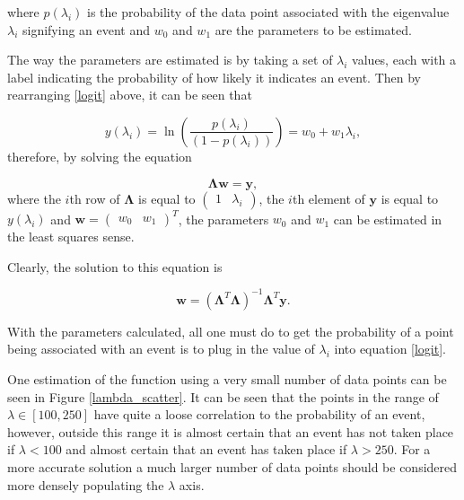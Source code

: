 \documentclass[11pt,a4paper]{article}
\begin{document}
where $p(\lambda_i)$ is the probability of the data point associated with the eigenvalue $\lambda_i$ signifying an event and $w_0$ and $w_1$ are the parameters to be estimated. 

The way the parameters are estimated is by taking a set of $\lambda_i$ values, each with a label indicating the probability of how likely it indicates an event. Then by rearranging \eqref{logit} above, it can be seen that

\begin{equation}
y(\lambda_i) = \ln\left( \frac{p(\lambda_i)}{(1-p(\lambda_i))}\right) = w_0 + w_1 \lambda_i,
\end{equation}
therefore, by solving the equation 

\begin{equation*}
 \mathbf{\Lambda}\mathbf{w} = \mathbf{y} ,
\end{equation*}
where the $i$th row of $\mathbf{\Lambda}$ is equal to $\left(\begin{matrix}
1 & \lambda_i
\end{matrix}  \right)$, the $i$th element of $\mathbf{y}$ is equal to $y(\lambda_i)$ and $\mathbf{w} = \left(\begin{matrix} w_0   &w_1\end{matrix}\right)^T$, the parameters $w_0$ and $w_1$ can be estimated in the least squares sense. 

Clearly, the solution to this equation is

\begin{equation*}
\mathbf{w} = \left( \mathbf{\Lambda}^T \mathbf{\Lambda}\right)^{-1} \mathbf{\Lambda}^T\mathbf{y}.
\end{equation*}

With the parameters calculated, all one must do to get the probability of a point being associated with an event is to plug in the value of $\lambda_i$ into equation \eqref{logit}. 

One estimation of the function using a very small number of data points can be seen in Figure \ref{lambda_scatter}. It can be seen that the points in the range of $\lambda \in [100, 250]$ have quite a loose correlation to the probability of an event, however, outside this range it is almost certain that an event has not taken place if $\lambda < 100$ and almost certain that an event has taken place if $\lambda > 250$. For a more accurate solution a much larger number of data points should be considered more densely populating the $\lambda$ axis.
\end{document}

